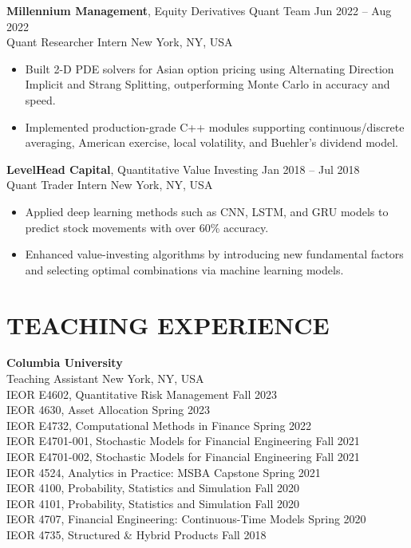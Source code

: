 \documentclass[margin, 10pt]{res} %
\begin{document}
\begin{resume}
\textbf{Millennium Management}, Equity Derivatives Quant Team \hfill Jun 2022 – Aug 2022\\
Quant Researcher Intern \hfill New York, NY, USA
\begin{itemize}
    \item Built 2-D PDE solvers for Asian option pricing using Alternating Direction Implicit and Strang Splitting, outperforming Monte Carlo in accuracy and speed.
    \item Implemented production-grade C++ modules supporting continuous/discrete averaging, American exercise, local volatility, and Buehler’s dividend model.
\end{itemize}

\textbf{LevelHead Capital}, Quantitative Value Investing \hfill Jan 2018 – Jul 2018\\
Quant Trader Intern \hfill New York, NY, USA
\begin{itemize}
    \item Applied deep learning methods such as CNN, LSTM, and GRU models to predict stock movements with over 60\% accuracy.
    \item Enhanced value-investing algorithms by introducing new fundamental factors and selecting optimal combinations via machine learning models.
\end{itemize}





\section{TEACHING EXPERIENCE} 
\textbf{Columbia University}\\
Teaching Assistant \hfill New York, NY, USA\\
IEOR E4602, Quantitative Risk Management \hfill Fall 2023\\
IEOR 4630, Asset Allocation \hfill Spring 2023\\
IEOR E4732, Computational Methods in Finance \hfill Spring 2022\\
IEOR E4701-001, Stochastic Models for Financial Engineering \hfill Fall 2021\\
IEOR E4701-002, Stochastic Models for Financial Engineering \hfill Fall 2021\\
IEOR 4524, Analytics in Practice: MSBA Capstone \hfill Spring 2021\\
IEOR 4100, Probability, Statistics and Simulation \hfill Fall 2020\\
IEOR 4101, Probability, Statistics and Simulation \hfill Fall 2020\\
IEOR 4707, Financial Engineering: Continuous-Time Models \hfill Spring 2020\\
IEOR 4735, Structured \& Hybrid Products \hfill Fall 2018\\





\end{resume}
\end{document}
